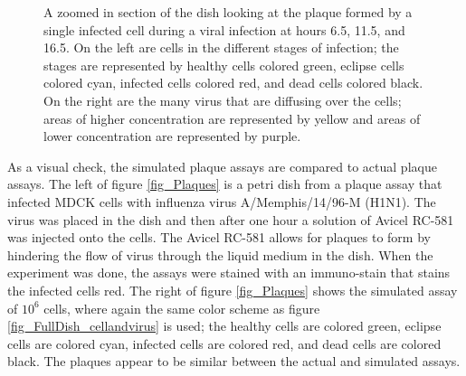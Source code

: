 \begin{figure}
\begin{minipage}{0.66\linewidth}
    \vspace{0.25em}
\end{minipage}
\caption{A zoomed in section of the dish looking at the plaque formed by a single infected cell during a viral infection at hours 6.5, 11.5, and 16.5. On the left are cells in the different stages of infection; the stages are represented by healthy cells colored green, eclipse cells colored cyan, infected cells colored red, and dead cells colored black. On the right are the many virus that are diffusing over the cells; areas of higher concentration are represented by yellow and areas of lower concentration are represented by purple. \label{fig_ZoominDish}}
\end{figure}

As a visual check, the simulated plaque assays are compared to actual plaque assays. The left of figure \ref{fig_Plaques} is a petri dish from a plaque assay that infected MDCK cells with influenza virus A/Memphis/14/96-M (H1N1). The virus was placed in the dish and then after one hour a solution of Avicel RC-581 was injected onto the cells. The Avicel RC-581 allows for plaques to form by hindering the flow of virus through the liquid medium in the dish. When the experiment was done, the assays were stained with an immuno-stain that stains the infected cells red. The right of figure \ref{fig_Plaques} shows the simulated assay of $10^{6}$ cells, where again the same color scheme as figure \ref{fig_FullDish_cellandvirus} is used; the healthy cells are colored green, eclipse cells are colored cyan, infected cells are colored red, and dead cells are colored black. The plaques appear to be similar between the actual and simulated assays.

